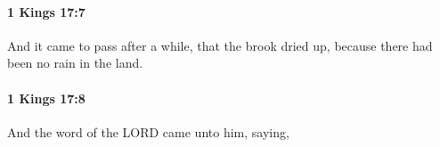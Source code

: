 		\paragraph{1 Kings 17:7} %
			\label{1KINGS-17-7}

			And it came to pass after a while, that the brook dried up, because there had been no rain in the land.


		\paragraph{1 Kings 17:8} %
			\label{1KINGS-17-8}

			And the word of the LORD came unto him, saying,


